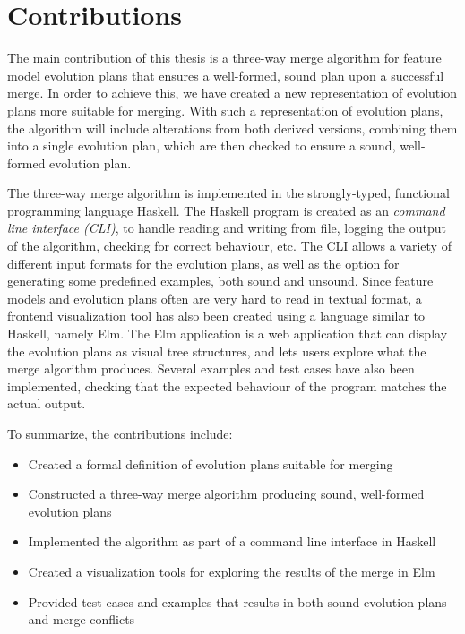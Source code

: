 \documentclass[a4paper,english]{ifimaster}
\begin{document}
\section{Contributions}%
\label{sec:contributions}

The main contribution of this thesis is a three-way merge algorithm for feature model evolution plans that ensures a well-formed, sound plan upon a successful merge. In order to achieve this, we have created a new representation of evolution plans more suitable for merging. With such a representation of evolution plans, the algorithm will include alterations from both derived versions, combining them into a single evolution plan, which are then checked to ensure a sound, well-formed evolution plan.

The three-way merge algorithm is implemented in the strongly-typed, functional programming language Haskell. The Haskell program is created as an \textit{command line interface (CLI)}, to handle reading and writing from file, logging the output of the algorithm, checking for correct behaviour, etc. The CLI allows a variety of different input formats for the evolution plans, as well as the option for generating some predefined examples, both sound and unsound. Since feature models and evolution plans often are very hard to read in textual format, a frontend visualization tool has also been created using a language similar to Haskell, namely Elm. The Elm application is a web application that can display the evolution plans as visual tree structures, and lets users explore what the merge algorithm produces. Several examples and test cases have also been implemented, checking that the expected behaviour of the program matches the actual output.

To summarize, the contributions include:

\begin{itemize}
  \item Created a formal definition of evolution plans suitable for merging
  \item Constructed a three-way merge algorithm producing sound, well-formed evolution plans
  \item Implemented the algorithm as part of a command line interface in Haskell
  \item Created a visualization tools for exploring the results of the merge in Elm
  \item Provided test cases and examples that results in both sound evolution plans and merge conflicts
\end{itemize}
\end{document}
